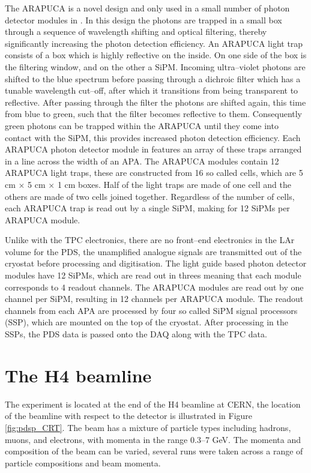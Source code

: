 The ARAPUCA is a novel design and only used in a small number of photon detector
modules in \protodune{}. In this design the photons are trapped in a small 
box through a sequence of wavelength shifting and optical filtering, thereby 
significantly increasing the photon detection efficiency\cite{Segreto:2018jdx}. 
An ARAPUCA light trap consists of a box which is highly reflective on the 
inside. On one side of the box is the filtering window, and on the other a 
SiPM. Incoming ultra--violet photons are shifted to the blue spectrum before 
passing through a dichroic filter which has a tunable wavelength cut--off, 
after which it transitions from being transparent to reflective. After passing 
through the filter the photons are shifted again, this time from blue to 
green, such that the filter becomes reflective to them. Consequently green 
photons can be trapped within the ARAPUCA until they come into contact with 
the SiPM, this provides increased photon detection efficiency. Each ARAPUCA 
photon detector module in \protodune{} features an array of these traps 
arranged in a line across the width of an APA. The ARAPUCA modules contain 12 
ARAPUCA light traps, these are constructed from 16 so called cells, which are 
5 cm $\times$ 5 cm $\times$ 1 cm boxes.  Half of the light traps are made of 
one cell and the others are made of two cells joined together. Regardless of 
the number of cells, each ARAPUCA trap is read out by a single SiPM, making 
for 12 SiPMs per ARAPUCA module.

Unlike with the TPC electronics, there are no front--end electronics in the LAr
volume for the PDS, the unamplified analogue signals are transmitted out of the
cryostat before processing and digitisation. The light guide based photon 
detector modules have 12 SiPMs, which are read out in threes meaning that each 
module corresponds to 4 readout channels. The ARAPUCA modules are read out by
one channel per SiPM, resulting in 12 channels per ARAPUCA module. The readout 
channels from each APA are processed by four so called SiPM signal processors 
(SSP), which are mounted on the top of the cryostat. After processing in the 
SSPs, the PDS data is passed onto the DAQ along with the TPC data.

\section{The H4 beamline} \label{sec:h4}

The \protodune{} experiment is located at the end of the H4 beamline at CERN,
the location of the beamline with respect to the detector is illustrated in
Figure \ref{fig:pdsp_CRT}. The beam has a mixture of particle types including
hadrons, muons, and electrons, with momenta in the range 0.3--7 GeV. The momenta
and composition of the beam can be varied, several runs were taken across a 
range of particle compositions and beam momenta.

